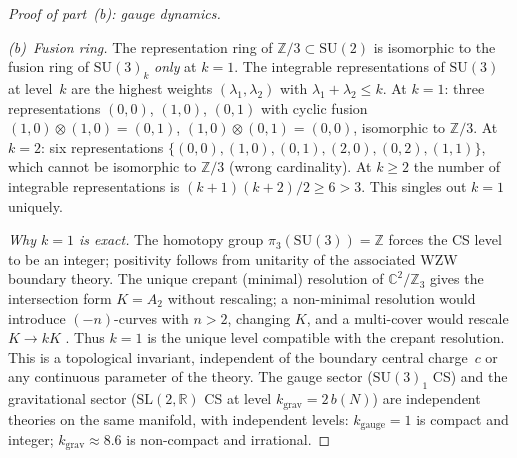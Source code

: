 \begin{proof}[Proof of part~(b): gauge dynamics]
\begin{itemize}
  \emph{(b)~Fusion ring.}
  The representation ring of
  $\mathbb{Z}/3 \subset \mathrm{SU}(2)$ is isomorphic to
  the fusion ring of $\mathrm{SU}(3)_k$ \emph{only} at $k = 1$.
  The integrable representations of $\mathrm{SU}(3)$ at
  level~$k$ are the highest weights $(\lambda_1, \lambda_2)$
  with $\lambda_1 + \lambda_2 \le k$.
  At $k = 1$: three representations
  $(0,0)$, $(1,0)$, $(0,1)$
  with cyclic fusion
  $(1,0) \otimes (1,0) = (0,1)$,
  $(1,0) \otimes (0,1) = (0,0)$,
  isomorphic to $\mathbb{Z}/3$.
  At $k = 2$: six representations
  $\{(0,0),(1,0),(0,1),(2,0),(0,2),(1,1)\}$,
  which cannot be isomorphic to $\mathbb{Z}/3$
  (wrong cardinality).
  At $k \ge 2$ the number of integrable representations
  is $(k{+}1)(k{+}2)/2 \ge 6 > 3$.
  This singles out $k = 1$ uniquely.
\end{itemize}
\noindent
\emph{Why $k = 1$ is exact.}
The homotopy group $\pi_3(\mathrm{SU}(3)) = \mathbb{Z}$ forces
the CS level to be an integer; positivity follows from
unitarity of the associated WZW boundary theory.
The unique crepant (minimal) resolution of
$\mathbb{C}^2/\mathbb{Z}_3$ gives the intersection form
$K = A_2$ without rescaling; a non-minimal resolution
would introduce $(-n)$-curves with $n > 2$, changing $K$,
and a multi-cover would rescale $K \to k K$
\citep{Kronheimer1989}.
Thus $k = 1$ is the unique level compatible with
the crepant resolution.
This is a topological invariant,
independent of the boundary central charge~$c$ or any
continuous parameter of the theory.
The gauge sector ($\mathrm{SU}(3)_1$ CS) and the
gravitational sector ($\mathrm{SL}(2,\mathbb{R})$ CS at
level $k_{\mathrm{grav}} = 2\,b(N)$) are independent
theories on the same manifold, with independent levels:
$k_{\mathrm{gauge}} = 1$ is compact and integer;
$k_{\mathrm{grav}} \approx 8.6$ is non-compact and irrational.


\end{proof}
